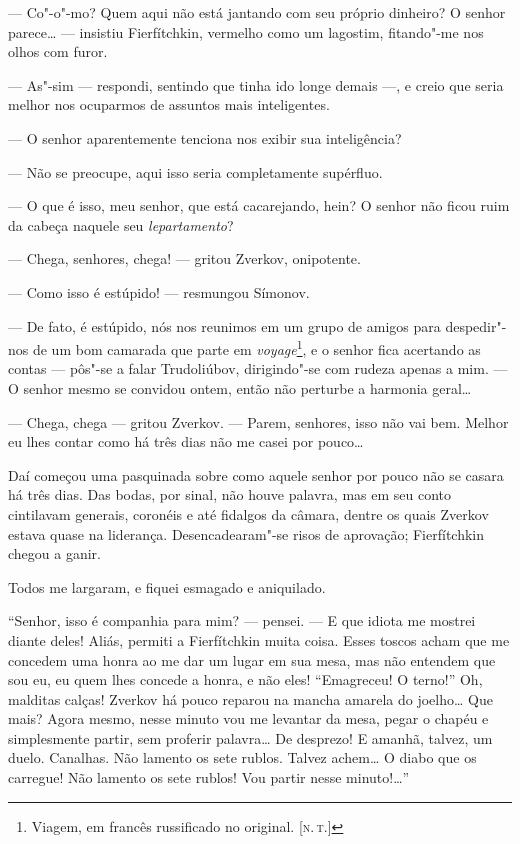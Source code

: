 --- Co"-o"-mo? Quem aqui não está jantando com seu próprio dinheiro? O
senhor parece\ldots{} --- insistiu Fierfítchkin, vermelho como um lagostim,
fitando"-me nos olhos com furor.

--- As"-sim --- respondi, sentindo que tinha
ido longe demais ---, e creio que seria melhor nos ocuparmos de assuntos
mais inteligentes.

--- O senhor aparentemente tenciona nos exibir sua inteligência?

--- Não se preocupe, aqui isso seria completamente supérfluo.

--- O que é isso, meu senhor, que está cacarejando, hein? O senhor não
ficou ruim da cabeça naquele seu \emph{lepartamento}?

--- Chega, senhores, chega! --- gritou Zverkov, onipotente.

--- Como isso é estúpido! --- resmungou Símonov.

--- De fato, é estúpido, nós nos reunimos em um grupo de amigos para
despedir"-nos de um bom camarada que parte em \emph{voyage}\footnote{Viagem,
  em francês russificado no original. {[}\textsc{n.\,t.}{]}}, e o senhor
fica acertando as contas --- pôs"-se a falar Trudoliúbov, dirigindo"-se com
rudeza apenas a mim. --- O senhor mesmo se convidou ontem, então não
perturbe a harmonia geral\ldots{}

--- Chega, chega --- gritou Zverkov. --- Parem, senhores, isso não vai bem.
Melhor eu lhes contar como há três dias não me casei por pouco\ldots{}

Daí começou uma pasquinada sobre como aquele senhor por pouco não se
casara há três dias. Das bodas, por sinal, não houve palavra, mas em seu
conto cintilavam generais, coronéis e até fidalgos da câmara, dentre os
quais Zverkov estava quase na liderança. Desencadearam"-se risos de
aprovação; Fierfítchkin chegou a ganir.

Todos me largaram, e fiquei esmagado e aniquilado.

``Senhor, isso é companhia para mim? --- pensei. --- E que idiota me mostrei
diante deles! Aliás, permiti a Fierfítchkin muita coisa. Esses toscos
acham que me concedem uma honra ao me dar um lugar em sua mesa, mas não
entendem que sou eu, eu quem lhes concede a honra, e não eles!
``Emagreceu! O terno!'' Oh, malditas calças! Zverkov há pouco reparou na
mancha amarela do joelho\ldots{} Que mais? Agora mesmo, nesse minuto vou me
levantar da mesa, pegar o chapéu e simplesmente partir, sem proferir
palavra\ldots{} De desprezo! E amanhã, talvez, um duelo. Canalhas. Não
lamento os sete rublos. Talvez achem\ldots{} O diabo que os carregue! Não
lamento os sete rublos! Vou partir nesse minuto!\ldots{}''

